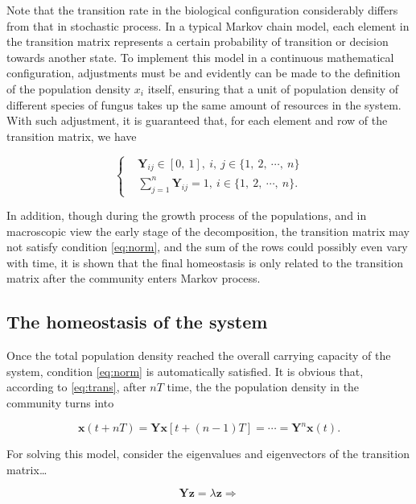 Note that the transition rate in the biological configuration considerably differs from that in stochastic process. In a typical Markov chain model, each element in the transition matrix represents a certain probability of transition or decision towards another state. To implement this model in a continuous mathematical configuration, adjustments must be and evidently can be made to the definition of the population density $x_i$ itself, ensuring that a unit of population density of different species of fungus takes up the same amount of resources in the system. With such adjustment, it is guaranteed that, for each element and row of the transition matrix, we have

\begin{equation}\label{eq:norm}
    \left\{\begin{aligned} &
        \boldsymbol{Y}_{ij} \in [0,\ 1],\ i,\ j\in\{1,\ 2,\ \cdots,\ n\} \\ &
        \sum_{j=1}^n \boldsymbol{Y}_{ij} = 1,\ i\in\{1,\ 2,\ \cdots,\ n\}.
    \end{aligned}\right.
\end{equation}

In addition, though during the growth process of the populations, and in macroscopic view the early stage of the decomposition, the transition matrix may not satisfy condition \eqref{eq:norm}, and the sum of the rows could possibly even vary with time, it is shown that the final homeostasis is only related to the transition matrix after the community enters Markov process.


\subsection{The homeostasis of the system}

Once the total population density reached the overall carrying capacity of the system, condition \eqref{eq:norm} is automatically satisfied. It is obvious that, according to \eqref{eq:trans}, after $nT$ time, the the population density in the community turns into

\begin{equation}
    \boldsymbol{x}(t+nT) =
    \boldsymbol{Y}\boldsymbol{x}[t+(n-1)T] = \cdots =
    \boldsymbol{Y}^n\boldsymbol{x}(t).
\end{equation}

For solving this model, consider the eigenvalues and eigenvectors of the transition matrix\dots

\begin{equation}
    \boldsymbol{Y}\boldsymbol{z} = \lambda\boldsymbol{z} \Rightarrow
    
\end{equation}